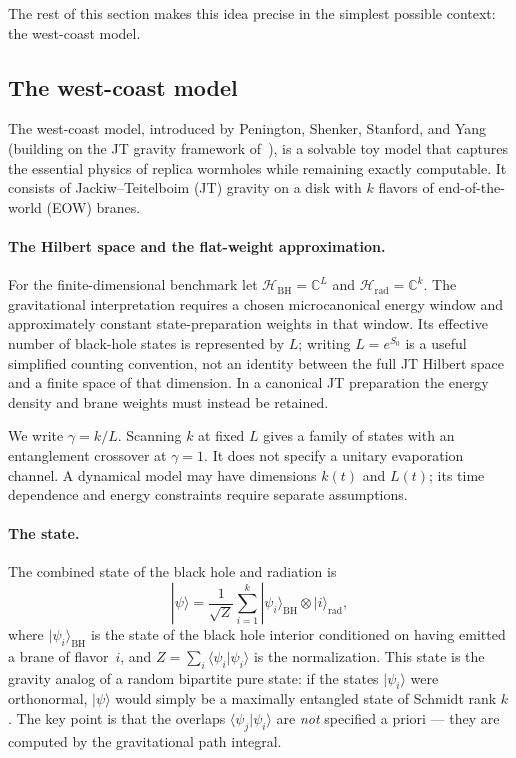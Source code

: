 \documentclass[11pt,letterpaper]{article}
\theoremstyle{plain}
\theoremstyle{definition}
\theoremstyle{remark}
\begin{document}
The rest of this section makes this idea precise in the simplest possible
context: the west-coast model.

\subsection{The west-coast model}
\label{subsec06:pssy_model}

The west-coast model, introduced by Penington, Shenker, Stanford, and
Yang~\citep{pssyetal2022} (building on the JT gravity framework
of~\citet{saadetal2019}), is a solvable toy model that captures the essential
physics of replica wormholes while remaining exactly computable.  It consists
of Jackiw--Teitelboim (JT) gravity on a disk with $k$ flavors of
end-of-the-world (EOW) branes.

\paragraph{The Hilbert space and the flat-weight approximation.}
For the finite-dimensional benchmark let
$\mathcal H_{\mathrm{BH}}=\mathbb C^L$ and
$\mathcal H_{\mathrm{rad}}=\mathbb C^k$.  The gravitational interpretation
requires a chosen microcanonical energy window and approximately constant
state-preparation weights in that window.  Its effective number of black-hole
states is represented by $L$; writing $L=e^{S_0}$ is a useful simplified
counting convention, not an identity between the full JT Hilbert space and a
finite space of that dimension.  In a canonical JT preparation the energy
density and brane weights must instead be retained.

We write $\gamma=k/L$.  Scanning $k$ at fixed $L$ gives a family of states
with an entanglement crossover at $\gamma=1$.  It does not specify a unitary
evaporation channel.  A dynamical model may have dimensions $k(t)$ and $L(t)$;
its time dependence and energy constraints require separate assumptions.

\paragraph{The state.}
The combined state of the black hole and radiation is
\begin{equation}
\label{eq06:psi_state}
|\psi\rangle = \frac{1}{\sqrt{Z}} \sum_{i=1}^{k}
  |\psi_i\rangle_{\mathrm{BH}} \otimes |i\rangle_{\mathrm{rad}},
\end{equation}
where $|\psi_i\rangle_{\mathrm{BH}}$ is the state of the black hole interior
conditioned on having emitted a brane of flavor~$i$, and
$Z = \sum_{i} \langle \psi_i | \psi_i \rangle$ is the normalization.  This
state is the gravity analog of a random bipartite pure state: if the states
$|\psi_i\rangle$ were orthonormal, $|\psi\rangle$ would simply be a maximally
entangled state of Schmidt rank $k$.  The key point is that the overlaps
$\langle \psi_j | \psi_i \rangle$ are \emph{not} specified a priori --- they are
computed by the gravitational path integral.
\end{document}
